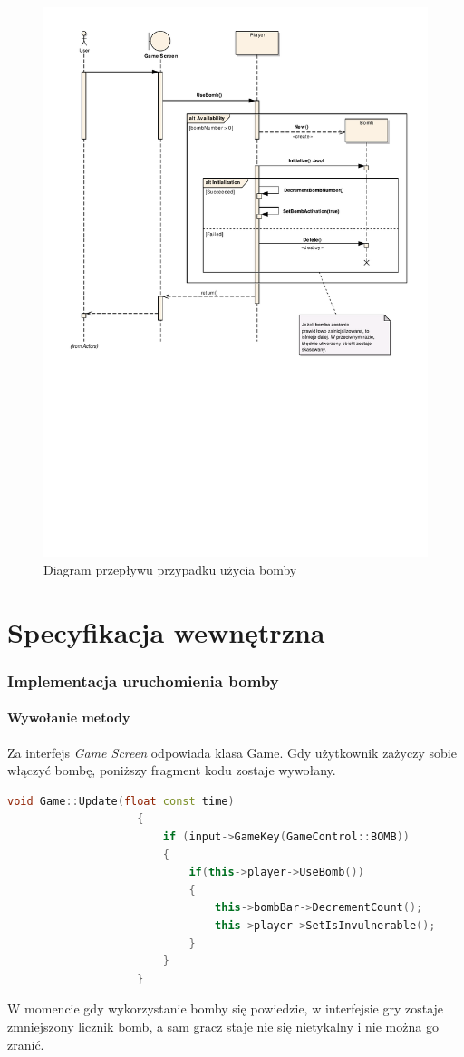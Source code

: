 \documentclass[a4paper,twoside]{article}
\begin{document}
	\begin{figure}[h!]
		\hspace{-25mm}
		\includegraphics[width=1.15\textwidth, trim={0 10cm 2cm 0}]{./images/Bomba.pdf}
		\caption{{\large Diagram przepływu przypadku użycia bomby}}
	\end{figure}
	
	\newpage
	\part{\huge \textbf{Specyfikacja wewnętrzna}}
		\section{Implementacja uruchomienia bomby}
			\subsection{Wywołanie metody}
				Za interfejs \emph{Game Screen} odpowiada klasa Game. Gdy użytkownik zażyczy sobie włączyć bombę, poniższy fragment kodu zostaje wywołany.
				\begin{lstlisting}[language=C++]
					void Game::Update(float const time)
					{
						if (input->GameKey(GameControl::BOMB))
						{
							if(this->player->UseBomb())
							{
								this->bombBar->DecrementCount();
								this->player->SetIsInvulnerable();
							}
						}
					}
				\end{lstlisting}
				W momencie gdy wykorzystanie bomby się powiedzie, w interfejsie gry zostaje zmniejszony licznik bomb, a sam gracz staje nie się nietykalny i nie można go zranić.
\end{document}
